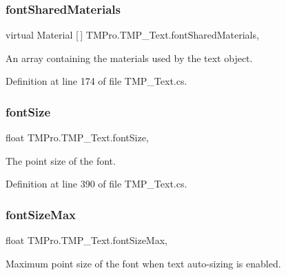\subsubsection{\texorpdfstring{fontSharedMaterials}{fontSharedMaterials}}
{\footnotesize\ttfamily virtual Material \mbox{[}$\,$\mbox{]} T\+M\+Pro.\+T\+M\+P\+\_\+\+Text.\+font\+Shared\+Materials\hspace{0.3cm}{\ttfamily [get]}, {\ttfamily [set]}}



An array containing the materials used by the text object. 



Definition at line 174 of file T\+M\+P\+\_\+\+Text.\+cs.

\mbox{\label{class_t_m_pro_1_1_t_m_p___text_a87683b2b2c721200b2822d16c0ce3dee}} 
\subsubsection{\texorpdfstring{fontSize}{fontSize}}
{\footnotesize\ttfamily float T\+M\+Pro.\+T\+M\+P\+\_\+\+Text.\+font\+Size\hspace{0.3cm}{\ttfamily [get]}, {\ttfamily [set]}}



The point size of the font. 



Definition at line 390 of file T\+M\+P\+\_\+\+Text.\+cs.

\mbox{\label{class_t_m_pro_1_1_t_m_p___text_ab277a475e80198b4c17e808465d455af}} 
\subsubsection{\texorpdfstring{fontSizeMax}{fontSizeMax}}
{\footnotesize\ttfamily float T\+M\+Pro.\+T\+M\+P\+\_\+\+Text.\+font\+Size\+Max\hspace{0.3cm}{\ttfamily [get]}, {\ttfamily [set]}}



Maximum point size of the font when text auto-\/sizing is enabled. 



